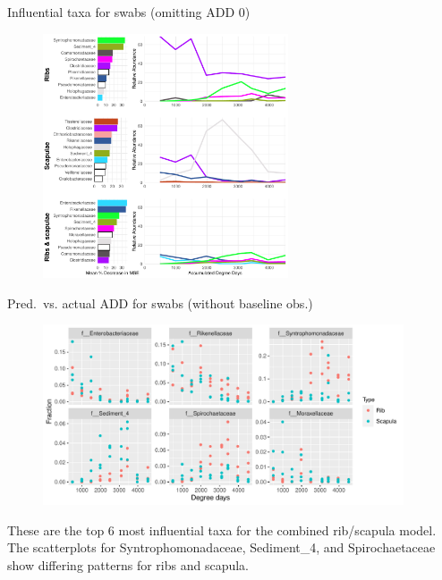 \documentclass{beamer}
\begin{document}
\begin{frame}{Influential taxa for swabs (omitting ADD 0)}

  \begin{center}
    \begin{figure}
      \includegraphics[height=2.85in]
        {w_swabs/bacteria/use_families/hl_combined_family_no_baseline_6panels}
    \end{figure}
  \end{center}

\end{frame}



\begin{frame}{Pred.\ vs. actual ADD for swabs (without baseline obs.)}

  \begin{center}
    \begin{figure}
      \includegraphics[height=2.1in]
        {w_swabs/bacteria/use_families/both_ribs_scapulae/no_baseline/infl_combined_swab_no_baseline_family_scatter}
    \end{figure}
  \end{center}

  \vspace{0.15in}

  \footnotesize{ \noindent These are the top 6 most influential taxa for the
    combined rib/scapula model.  The scatterplots for Syntrophomonadaceae,
    Sediment\_4, and Spirochaetaceae show differing patterns for ribs and
    scapula.
    }

\end{frame}
\end{document}
